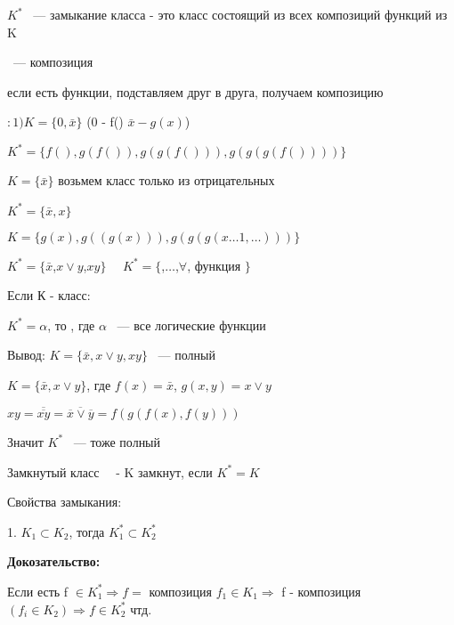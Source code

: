 \documentclass[russian]{lecture-notes}
\begin{document}
			$K^{*}$ ~--- замыкание класса - это класс состоящий из всех композиций функций из K


			 ~--- композиция

			если есть функции, подставляем друг в друга, получаем композицию

	\begin{example}
		$:1) K = \{0,\bar{x}\}$ \quad (0 - f() $\bar{x} - g(x)$)

		$K^{*} = \{ f(), g(f()), g(g(f())), g(g(g(f())))\}$
\end{example}
	\begin{example}
		$K = \{\bar{x}\}$ возьмем класс только из отрицательных

		$K^{*} = \{ \bar{x}, x\}$

		$K = \{ g(x), g((g(x))), g(g(g(x \dots 1, \dots )))\}$
\end{example}
	\begin{example}
		$K^{*}=\{ \bar{x}$,$ x \lor y$,$ xy \}$  $\quad K^{*} = \{ $,$ \dots$,$ \forall$, функция $\}$
	\end{example}

	\begin{definition}

		Если К - класс:

		$K^{*} = \alpha$, то , где $\alpha$ ~--- все логические функции

		Вывод: $K = \{ \bar{x}, x \lor y, xy\}$ ~--- полный

		\end{definition}
		\begin{example}

			$K = \{\bar{x}, x \lor y \}$, где $f(x) = \bar{x}$, $g(x, y) = x \lor y$
		\end{example}
		
		$xy = \overline{\overline{xy}} = \overline{\overline{x} \lor \overline{y}}
		 = f(g(f(x),f(y)))$  %

		Значит $K^{*}$ ~--- тоже полный


	\begin{definition}
		Замкнутый класс ~~- K замкнут, если $K^{*} = K$
		\end{definition}

	Свойства замыкания:

	1. $K_{1} \subset K_{2}$, тогда $K_{1}^{*} \subset K_{2}^{*}$

	\textbf{Докозательство:}

		Если есть f $\in K_{1}^{*} \Rightarrow f = $ композиция $f_{1} \in K_{1} \Rightarrow$
	f - композиция $(f_{i} \in K_{2}) \Rightarrow f \in K_{2}^{*} $ чтд.
\end{document}
